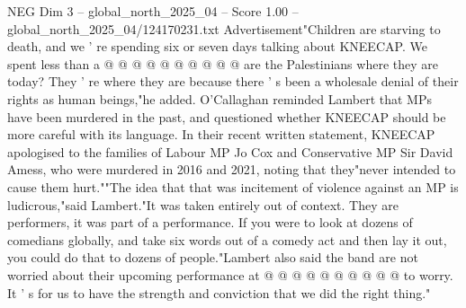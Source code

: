 \begin{textsample}{NEG Dim 3 – global\_north\_2025\_04 – Score 1.00 – global\_north\_2025\_04/124170231.txt}
Advertisement"Children are starving to death, and we ' re spending six or seven days talking about KNEECAP.
We spent less than a @ @ @ @ @ @ @ @ @ @ are the Palestinians where they are today?
They ' re where they are because there ' s been a wholesale denial of their rights as human beings,"he added.
O'Callaghan reminded Lambert that MPs have been murdered in the past, and questioned whether KNEECAP should be more careful with its language.
In their recent written statement, KNEECAP apologised to the families of Labour MP Jo Cox and Conservative MP Sir David Amess, who were murdered in 2016 and 2021, noting that they"never intended to cause them hurt.""The idea that that was incitement of violence against an MP is ludicrous,"said Lambert."It was taken entirely out of context.
They are performers, it was part of a performance.
If you were to look at dozens of comedians globally, and take six words out of a comedy act and then lay it out, you could do that to dozens of people."Lambert also said the band are not worried about their upcoming performance at @ @ @ @ @ @ @ @ @ @ to worry.
It ' s for us to have the strength and conviction that we did the right thing."

\end{textsample}
